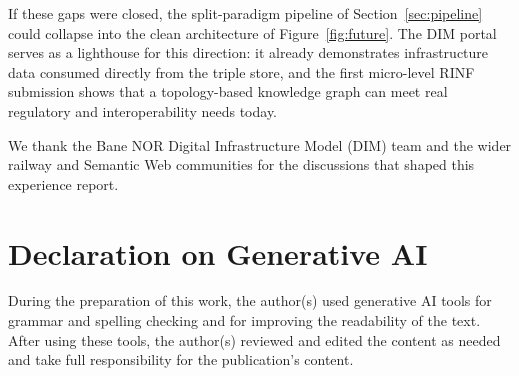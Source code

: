 \documentclass{ceurart}
\begin{document}
If these gaps were closed, the split-paradigm pipeline of
Section~\ref{sec:pipeline} could collapse into the clean architecture of
Figure~\ref{fig:future}. The DIM portal~\cite{dim} serves as a lighthouse for
this direction: it already demonstrates infrastructure data consumed directly
from the triple store, and the first micro-level RINF submission shows that a
topology-based knowledge graph can meet real regulatory and interoperability
needs today.

\begin{acknowledgments}
  We thank the Bane NOR Digital Infrastructure Model (DIM) team and the wider
  railway and Semantic Web communities for the discussions that shaped this
  experience report.
\end{acknowledgments}

\section*{Declaration on Generative AI}
During the preparation of this work, the author(s) used generative AI tools for
grammar and spelling checking and for improving the readability of the text.
After using these tools, the author(s) reviewed and edited the content as needed
and take full responsibility for the publication's content.


\end{document}
